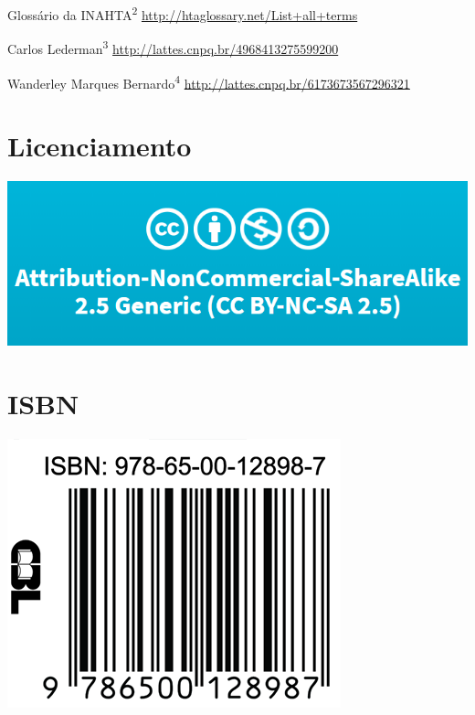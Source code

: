 \documentclass[
  openany]{book}
\begin{document}
Glossário da INAHTA\textsuperscript{2}
\url{http://htaglossary.net/List+all+terms}

Carlos Lederman\textsuperscript{3}
\url{http://lattes.cnpq.br/4968413275599200}

Wanderley Marques Bernardo\textsuperscript{4}
\url{http://lattes.cnpq.br/6173673567296321}

\hypertarget{licenciamento}{%
\chapter*{Licenciamento}\label{licenciamento}}

\begin{center}\includegraphics[width=height=4in,width=3in]{licenca_isbn} \end{center}

\hypertarget{isbn}{%
\chapter*{ISBN}\label{isbn}}

\begin{center}\includegraphics[width=height=4in,width=3in]{isbnv2} \end{center}
\end{document}
